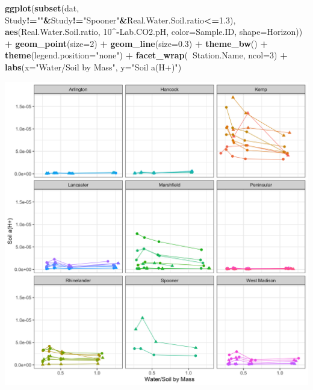 \documentclass[]{article}
\newenvironment{Shaded}{\begin{snugshade}}{\end{snugshade}}
\newcommand{\DataTypeTok}[1]{\textcolor[rgb]{0.13,0.29,0.53}{#1}}
\newcommand{\DecValTok}[1]{\textcolor[rgb]{0.00,0.00,0.81}{#1}}
\newcommand{\FloatTok}[1]{\textcolor[rgb]{0.00,0.00,0.81}{#1}}
\newcommand{\KeywordTok}[1]{\textcolor[rgb]{0.13,0.29,0.53}{\textbf{#1}}}
\newcommand{\NormalTok}[1]{#1}
\newcommand{\OperatorTok}[1]{\textcolor[rgb]{0.81,0.36,0.00}{\textbf{#1}}}
\newcommand{\StringTok}[1]{\textcolor[rgb]{0.31,0.60,0.02}{#1}}
\begin{document}
\begin{Shaded}
\begin{Highlighting}[]
\KeywordTok{ggplot}\NormalTok{(}\KeywordTok{subset}\NormalTok{(dat, Study}\OperatorTok{!=}\StringTok{""}\OperatorTok{&}\NormalTok{Study}\OperatorTok{!=}\StringTok{"Spooner"}\OperatorTok{&}\NormalTok{Real.Water.Soil.ratio}\OperatorTok{<=}\FloatTok{1.3}\NormalTok{), }\KeywordTok{aes}\NormalTok{(Real.Water.Soil.ratio, }\DecValTok{10}\OperatorTok{^-}\NormalTok{Lab.CO2.pH, }\DataTypeTok{color=}\NormalTok{Sample.ID, }\DataTypeTok{shape=}\NormalTok{Horizon)) }\OperatorTok{+}\StringTok{ }
\StringTok{  }\KeywordTok{geom_point}\NormalTok{(}\DataTypeTok{size=}\DecValTok{2}\NormalTok{) }\OperatorTok{+}\StringTok{ }\KeywordTok{geom_line}\NormalTok{(}\DataTypeTok{size=}\FloatTok{0.3}\NormalTok{) }\OperatorTok{+}\StringTok{ }\KeywordTok{theme_bw}\NormalTok{() }\OperatorTok{+}\StringTok{ }\KeywordTok{theme}\NormalTok{(}\DataTypeTok{legend.position=}\StringTok{"none"}\NormalTok{) }\OperatorTok{+}
\StringTok{  }\KeywordTok{facet_wrap}\NormalTok{(}\OperatorTok{~}\NormalTok{Station.Name, }\DataTypeTok{ncol=}\DecValTok{3}\NormalTok{) }\OperatorTok{+}\StringTok{ }\KeywordTok{labs}\NormalTok{(}\DataTypeTok{x=}\StringTok{"Water/Soil by Mass"}\NormalTok{, }\DataTypeTok{y=}\StringTok{"Soil a(H+)"}\NormalTok{)}
\end{Highlighting}
\end{Shaded}

\includegraphics{output-rmd/jackson-plot-activity-wisc-1.png}
\end{document}
